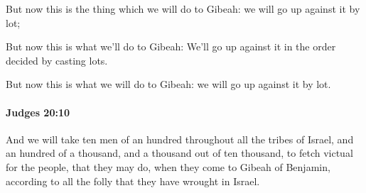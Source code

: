 			\begin{versebox}
					\item[BHS] 
					\item[ASV] But now this is the thing which we will do to Gibeah: we will go up against it by lot;
					\item[NIV] But now this is what we’ll do to Gibeah: We’ll go up against it in the order decided by casting lots.
					\item[NRSV] But now this is what we will do to Gibeah: we will go up against it by lot.
			\end{versebox}

		\paragraph{Judges 20:10} %
			\label{JUDGES-20-10}

			And we will take ten men of an hundred throughout all the tribes of Israel, and an hundred of a thousand, and a thousand out of ten thousand, to fetch victual for the people, that they may do, when they come to Gibeah of Benjamin, according to all the folly that they have wrought in Israel.

